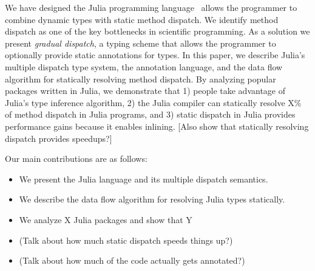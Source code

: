 We have designed the Julia programming language~\cite{Bezanson2012, Bezanson2014} allows the programmer to combine dynamic types with static method dispatch. We identify method dispatch as one of the key bottlenecks in scientific programming. As a solution we present \emph{gradual dispatch}, a typing scheme that allows the programmer to optionally provide static annotations for types. In this paper, we describe Julia's multiple dispatch type system, the annotation language, and the data flow algorithm for statically resolving method dispatch. By analyzing popular packages written in Julia, we demonstrate that 1) people take advantage of Julia's type inference algorithm, 2) the Julia compiler can statically resolve X\% of method dispatch in Julia programs, and 3) static dispatch in Julia provides performance gains because it enables inlining. [Also show that statically resolving dispatch provides speedups?]



Our main contributions are as follows:
\begin{itemize}
\item We present the Julia language and its multiple dispatch semantics.
\item We describe the data flow algorithm for resolving Julia types statically.
\item We analyze X Julia packages and show that Y%
\item (Talk about how much static dispatch speeds things up?)
\item (Talk about how much of the code actually gets annotated?)
\end{itemize}

